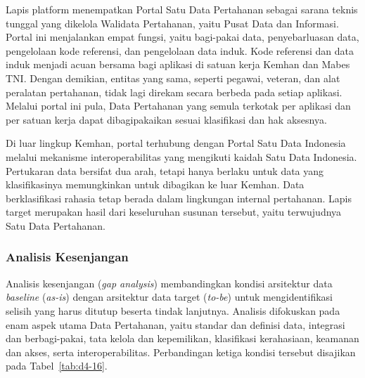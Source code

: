 Lapis platform menempatkan Portal Satu Data Pertahanan sebagai sarana teknis tunggal yang dikelola Walidata Pertahanan, yaitu Pusat Data dan Informasi. Portal ini menjalankan empat fungsi, yaitu bagi-pakai data, penyebarluasan data, pengelolaan kode referensi, dan pengelolaan data induk. Kode referensi dan data induk menjadi acuan bersama bagi aplikasi di satuan kerja Kemhan dan Mabes TNI. Dengan demikian, entitas yang sama, seperti pegawai, veteran, dan alat peralatan pertahanan, tidak lagi direkam secara berbeda pada setiap aplikasi. Melalui portal ini pula, Data Pertahanan yang semula terkotak per aplikasi dan per satuan kerja dapat dibagipakaikan sesuai klasifikasi dan hak aksesnya.

Di luar lingkup Kemhan, portal terhubung dengan Portal Satu Data Indonesia melalui mekanisme interoperabilitas yang mengikuti kaidah Satu Data Indonesia. Pertukaran data bersifat dua arah, tetapi hanya berlaku untuk data yang klasifikasinya memungkinkan untuk dibagikan ke luar Kemhan. Data berklasifikasi rahasia tetap berada dalam lingkungan internal pertahanan. Lapis target merupakan hasil dari keseluruhan susunan tersebut, yaitu terwujudnya Satu Data Pertahanan.

\subsubsection{Analisis Kesenjangan}

Analisis kesenjangan (\textit{gap analysis}) membandingkan kondisi arsitektur data \textit{baseline} (\textit{as-is}) dengan arsitektur data target (\textit{to-be}) untuk mengidentifikasi selisih yang harus ditutup beserta tindak lanjutnya. Analisis difokuskan pada enam aspek utama Data Pertahanan, yaitu standar dan definisi data, integrasi dan berbagi-pakai, tata kelola dan kepemilikan, klasifikasi kerahasiaan, keamanan dan akses, serta interoperabilitas. Perbandingan ketiga kondisi tersebut disajikan pada Tabel~\ref{tab:d4-16}.

